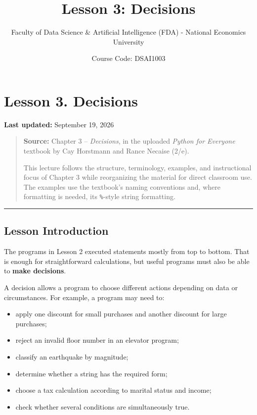 \documentclass[
  11pt,
  a4paper,
]{article}
\title{Lesson 3: Decisions}
\author{Faculty of Data Science \& Artificial Intelligence (FDA) - National Economics University}
\date{Course Code: DSAI1003}
\providecommand{\tightlist}{%
  \setlength{\itemsep}{0pt}\setlength{\parskip}{0pt}}
\begin{document}
\maketitle

{
\setcounter{tocdepth}{3}
\tableofcontents
}
\section{Lesson 3. Decisions}\label{lesson-3.-decisions}

\textbf{Last updated:} September 19, 2026

\begin{quote}
\textbf{Source:} Chapter 3 -- \emph{Decisions}, in the uploaded
\emph{Python for Everyone} textbook by Cay Horstmann and Rance Necaise
(2/e).

This lecture follows the structure, terminology, examples, and
instructional focus of Chapter 3 while reorganizing the material for
direct classroom use. The examples use the textbook's naming conventions
and, where formatting is needed, its \texttt{\%}-style string
formatting.
\end{quote}

\begin{center}\rule{0.5\linewidth}{0.5pt}\end{center}

\subsection{Lesson Introduction}\label{lesson-introduction}

The programs in Lesson 2 executed statements mostly from top to bottom.
That is enough for straightforward calculations, but useful programs
must also be able to \textbf{make decisions}.

A decision allows a program to choose different actions depending on
data or circumstances. For example, a program may need to:

\begin{itemize}
\tightlist
\item
  apply one discount for small purchases and another discount for large
  purchases;
\item
  reject an invalid floor number in an elevator program;
\item
  classify an earthquake by magnitude;
\item
  determine whether a string has the required form;
\item
  choose a tax calculation according to marital status and income;
\item
  check whether several conditions are simultaneously true.
\end{itemize}
\end{document}

